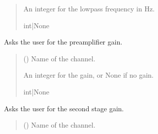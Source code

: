 \documentclass[letterpaper,10pt,english]{sphinxmanual}
\begin{document}
\begin{fulllineitems}
\begin{fulllineitems}
\begin{quote}
\begin{description}
\sphinxAtStartPar
An integer for the low\sphinxhyphen{}pass frequency in Hz.

\sphinxAtStartPar
int|None

\end{description}\end{quote}

\end{fulllineitems}


\begin{fulllineitems}
\label{\detokenize{Setup.SetupOneDevice:Setup.SetupOneDevice.Setup_8401HR.Setup8401HR._SetPreampGain}}
\pysigstartsignatures
{}
\pysigstopsignatures
\sphinxAtStartPar
Asks the user for the preamplifier gain.
\begin{quote}\begin{description}
\sphinxAtStartPar
{} () \textendash{} Name of the channel.

\sphinxAtStartPar
An integer for the gain, or None if no gain.

\sphinxAtStartPar
int|None

\end{description}\end{quote}

\end{fulllineitems}


\begin{fulllineitems}
\label{\detokenize{Setup.SetupOneDevice:Setup.SetupOneDevice.Setup_8401HR.Setup8401HR._SetSSGain}}
\pysigstartsignatures
{}
\pysigstopsignatures
\sphinxAtStartPar
Asks the user for the second stage gain.
\begin{quote}\begin{description}
\sphinxAtStartPar
{} () \textendash{} Name of the channel.


\end{description}
\end{quote}
\end{fulllineitems}
\end{fulllineitems}
\end{document}
